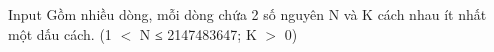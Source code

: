 Input
Gồm nhiều dòng, mỗi dòng chứa 2 số nguyên N và K cách nhau ít nhất một dấu cách. (1 $<$ N ≤ 2147483647; K $>$ 0)